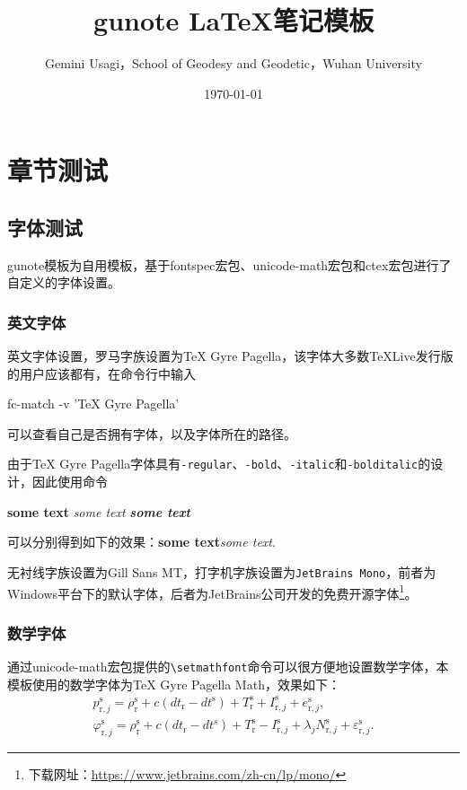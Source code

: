 \documentclass{gunote}
\title{gunote \LaTeX{}笔记模板}
\author{Gemini Usagi，School of Geodesy and Geodetic，Wuhan University}
\date{\today}
\newcommand{\cmd}[1]{\texttt{\backslash #1}}
\begin{document}
\maketitle
\tableofcontents
\chapter{章节测试}
\section{字体测试}
\textsf{gunote}模板为自用模板，基于\textsf{fontspec}宏包、\textsf{unicode-math}宏包和\textsf{ctex}宏包进行了自定义的字体设置。
\subsection{英文字体}
英文字体设置，罗马字族设置为TeX Gyre Pagella，该字体大多数\TeX{}Live发行版的用户应该都有，在命令行中输入
\begin{Code*}[text]
fc-match -v 'TeX Gyre Pagella'
\end{Code*}
可以查看自己是否拥有字体，以及字体所在的路径。
\begin{Code*}[latex]
\setmainfont{TeX Gyre Pagella}
\end{Code*}
由于TeX Gyre Pagella字体具有\texttt{-regular}、\texttt{-bold}、\texttt{-italic}和\texttt{-bolditalic}的设计，因此使用命令
\begin{Code*}[latex]
\textbf{some text}
\textit{some text}
{\bfseries\itshape some text}
\end{Code*}
可以分别得到如下的效果：\textbf{some text}\quad\textit{some text}.

无衬线字族设置为\textsf{Gill Sans MT}，打字机字族设置为\texttt{JetBrains Mono}，前者为Windows平台下的默认字体，后者为JetBrains公司开发的免费开源字体\footnote{下载网址：\url{https://www.jetbrains.com/zh-cn/lp/mono/}}。
\subsection{数学字体}
通过\textsf{unicode-math}宏包提供的\cmd{setmathfont}命令可以很方便地设置数学字体，本模板使用的数学字体为TeX Gyre Pagella Math，效果如下：
{
\def\rcv{\mathrm{r}}
\def\sat{\mathrm{s}}
\begin{gather}
  p_{\rcv,j}^\sat=\rho_\rcv^\sat+c(dt_\rcv-dt^\sat)+T_\rcv^\sat+I_{\rcv,j}^\sat+e_{\rcv,j}^\sat,\\
  \varphi_{\rcv,j}^\sat=\rho_\rcv^\sat+c(dt_\rcv-dt^\sat)+T_\rcv^\sat-I_{\rcv,j}^\sat+\lambda_j N_{\rcv,j}^\sat+\varepsilon_{\rcv,j}^\sat.
\end{gather}
}
\end{document}
